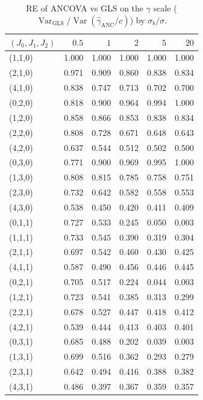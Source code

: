 \documentclass[
  11pt,
]{article}
\begin{document}
\begin{table}

\caption{\label{tab:re-table-anc}RE of ANCOVA vs GLS on the $\gamma$ scale ($\mathop{\mathrm{Var}}_{\text{GLS}} / \mathop{\mathrm{Var}}(\hat\gamma_{\text{ANC}}/c)$) by $\sigma_b/\sigma$.}
\centering
\begin{tabular}[t]{lrrrrr}
\toprule
$(J_0,J_1,J_2)$ & $0.5$ & $1$ & $2$ & $5$ & $20$\\
\midrule
(1,1,0) & 1.000 & 1.000 & 1.000 & 1.000 & 1.000\\
(2,1,0) & 0.971 & 0.909 & 0.860 & 0.838 & 0.834\\
(4,1,0) & 0.838 & 0.747 & 0.713 & 0.702 & 0.700\\
(0,2,0) & 0.818 & 0.900 & 0.964 & 0.994 & 1.000\\
(1,2,0) & 0.858 & 0.866 & 0.853 & 0.838 & 0.834\\
\addlinespace
(2,2,0) & 0.808 & 0.728 & 0.671 & 0.648 & 0.643\\
(4,2,0) & 0.637 & 0.544 & 0.512 & 0.502 & 0.500\\
(0,3,0) & 0.771 & 0.900 & 0.969 & 0.995 & 1.000\\
(1,3,0) & 0.808 & 0.815 & 0.785 & 0.758 & 0.751\\
(2,3,0) & 0.732 & 0.642 & 0.582 & 0.558 & 0.553\\
\addlinespace
(4,3,0) & 0.538 & 0.450 & 0.420 & 0.411 & 0.409\\
(0,1,1) & 0.727 & 0.533 & 0.245 & 0.050 & 0.003\\
(1,1,1) & 0.733 & 0.545 & 0.390 & 0.319 & 0.304\\
(2,1,1) & 0.697 & 0.542 & 0.460 & 0.430 & 0.425\\
(4,1,1) & 0.587 & 0.490 & 0.456 & 0.446 & 0.445\\
\addlinespace
(0,2,1) & 0.705 & 0.517 & 0.224 & 0.044 & 0.003\\
(1,2,1) & 0.723 & 0.541 & 0.385 & 0.313 & 0.299\\
(2,2,1) & 0.678 & 0.527 & 0.447 & 0.418 & 0.412\\
(4,2,1) & 0.539 & 0.444 & 0.413 & 0.403 & 0.401\\
(0,3,1) & 0.685 & 0.488 & 0.202 & 0.039 & 0.003\\
\addlinespace
(1,3,1) & 0.699 & 0.516 & 0.362 & 0.293 & 0.279\\
(2,3,1) & 0.642 & 0.494 & 0.416 & 0.388 & 0.382\\
(4,3,1) & 0.486 & 0.397 & 0.367 & 0.359 & 0.357\\
\bottomrule
\end{tabular}
\end{table}
\end{document}
